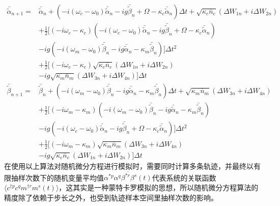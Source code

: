 \begin{equation}
\begin{aligned}
\bar{\tilde{\alpha}}_{n+1}={}&\bar{\tilde{\alpha}}_{n}+(-i(\omega_{c}-\omega_{0})\bar{\tilde{\alpha}}_{n}-ig\bar{\tilde{\beta}}_{n}+\Omega -\kappa_{c}\bar{\tilde{\alpha}}_{n})\Delta t+\sqrt{\kappa_c\overline{n}_{c}}(\Delta{W}_{1n}+i\Delta{W}_{2n}) \\
&+\frac{1}{2} \Big[ (-i\omega_c-\kappa_c) (-i(\omega_{c}-\omega_{0})\bar{\tilde{\alpha}}_{n}-ig\bar{\tilde{\beta}}_{n}+\Omega -\kappa_{c}\bar{\tilde{\alpha}}_{n}) \\
&- ig (-i(\omega_{m}-\omega_{0})\bar{\tilde{\beta}}_{n}-ig\bar{\tilde{\alpha}}_{n}-\kappa_{m}\bar{\tilde{\beta}}_{n}) \Big] \Delta t^2 \\
&+\frac{1}{2} \Big[ (-i\omega_c-\kappa_c) \sqrt{\kappa_c\overline{n}_{c}}(\Delta{W}_{1n}+i\Delta{W}_{2n}) \\
&- ig \sqrt{\kappa_m\overline{n}_{m}}(\Delta{W}_{3n}+i\Delta{W}_{4n}) \Big] \Delta t \\
\bar{\tilde{\beta}}_{n+1}={}&\bar{\tilde{\beta}}_{n}+(-i(\omega_{m}-\omega_{0})\bar{\tilde{\beta}}_{n}-ig\bar{\tilde{\alpha}}_{n}-\kappa_{m}\bar{\tilde{\beta}}_{n})\Delta t+\sqrt{\kappa_m\overline{n}_{m}}(\Delta{W}_{3n}+i\Delta{W}_{4n}) \\
&+\frac{1}{2} \Big[ (-i\omega_m-\kappa_m) (-i(\omega_{m}-\omega_{0})\bar{\tilde{\beta}}_{n}-ig\bar{\tilde{\alpha}}_{n}-\kappa_{m}\bar{\tilde{\beta}}_{n}) \\
&- ig (-i(\omega_{c}-\omega_{0})\bar{\tilde{\alpha}}_{n}-ig\bar{\tilde{\beta}}_{n}+\Omega -\kappa_{c}\bar{\tilde{\alpha}}_{n}) \Big] \Delta t^2 \\
&+\frac{1}{2} \Big[ (-i\omega_m-\kappa_m) \sqrt{\kappa_m\overline{n}_{m}}(\Delta{W}_{3n}+i\Delta{W}_{4n}) \\
&- ig \sqrt{\kappa_c\overline{n}_{c}}(\Delta{W}_{1n}+i\Delta{W}_{2n}) \Big] \Delta t
\end{aligned}
\end{equation}
在使用以上算法对随机微分方程进行模拟时，需要同时计算多条轨迹，并最终以有限抽样次数下的随机变量平均值$\overline{\alpha^{*p}\alpha^{q}\beta^{*r}\beta^{s}(t)}$代表系统的关联函数$\langle c^{\dag p}c^{q} m^{\dag r}m^{s}(t)\rangle$，这其实是一种蒙特卡罗模拟的思想，所以随机微分方程算法的精度除了依赖于步长之外，也受到轨迹样本空间里抽样次数的影响。
